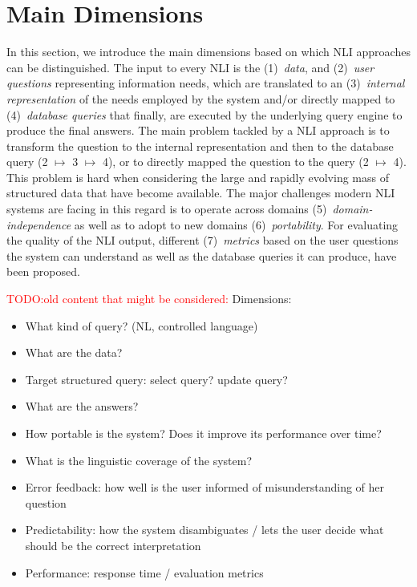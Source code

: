 \documentclass[10pt,journal,letterpaper,compsoc]{IEEEtran}
\newcommand\TODO[1]{{\textcolor{red}{TODO:#1}}}
\begin{document}
\section{Main Dimensions}
\label{sec:main-dimensions}
In this section, we introduce the main dimensions based on which NLI approaches
can be distinguished. The input to every NLI is the (1)~\emph{data}, and
(2)~\emph{user questions} representing information needs, which are translated
to an (3)~\emph{internal representation} of the needs employed by the system
and/or directly mapped to (4)~\emph{database queries} that finally, are
executed by the underlying query engine to produce the final answers. The main
problem tackled by a NLI approach is to transform the question to the internal
representation and then to the database query (2 $\mapsto$ 3 $\mapsto$ 4), or
to directly mapped the question to the query (2 $\mapsto$ 4). This problem is
hard when considering the large and rapidly evolving mass of structured data
that have become available. The major challenges modern NLI systems are facing
in this regard is to operate across domains (5)~\emph{domain-independence} as
well as to adopt to new domains (6)~\emph{portability}. For evaluating the
quality of the NLI output, different (7)~\emph{metrics} based on the user
questions the system can understand as well as the database queries it can
produce, have been proposed.

\TODO{old content that might be considered:} 
Dimensions:
\begin{itemize}
  \item What kind of query? (NL, controlled language)
  \item What are the data? 
  \item Target structured query: select query? update query?
  \item What are the answers?
  \item How portable is the system? Does it improve its performance over time?
  \item What is the linguistic coverage of the system? 
  \item Error feedback: how well is the user informed of misunderstanding of her
  question
  \item Predictability: how the system disambiguates / lets the user decide what
  should be the correct interpretation
  \item Performance: response time / evaluation metrics
\end{itemize}
\end{document}
